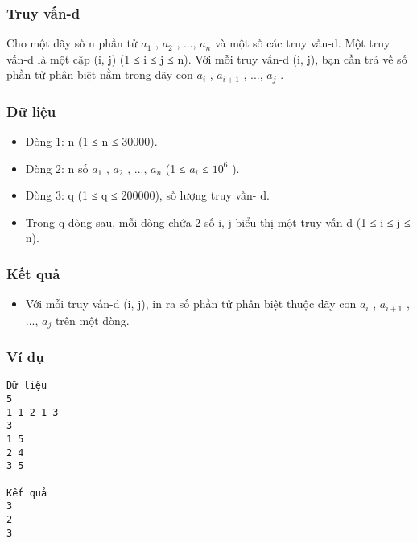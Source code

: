 



\subsubsection{   Truy vấn-d  }

   Cho một dãy số n phần tử $a_{1}$   ,   $a_{2}$   , ..., $a_{n}$   và một số các truy vấn-d. Một truy vấn-d là một cặp (i, j) (1 ≤ i   ≤ j ≤ n). Với mỗi truy vấn-d (i, j), bạn cần trả về số phần   tử phân biệt nằm trong dãy con $a_{i}$   ,   $a_{i+1}$   , ..., $a_{j}$   .  

\subsubsection{   Dữ liệu  }
\begin{itemize}
	\item     Dòng 1: n (1 ≤ n ≤ 30000).   
	\item     Dòng 2: n số $a_{1}$    , $a_{2}$    , ...,   $a_{n}$    (1 ≤ $a_{i}$    ≤   $10^{6}$    ).   
	\item     Dòng 3: q (1 ≤ q ≤ 200000), số lượng truy vấn-  d.   
	\item     Trong q dòng sau, mỗi dòng chứa 2 số i, j biểu thị một   truy vấn-d (1 ≤ i ≤ j ≤ n).   
\end{itemize}

\subsubsection{   Kết quả  }
\begin{itemize}
	\item     Với mỗi truy vấn-d (i, j), in ra số phần tử phân biệt thuộc   dãy con $a_{i}$    , $a_{i+1}$    , ...,   $a_{j}$    trên một dòng.    


\end{itemize}

\subsubsection{   Ví dụ  }
\begin{verbatim}
Dữ liệu
5
1 1 2 1 3
3
1 5
2 4
3 5

Kết quả
3
2
3 
\end{verbatim}
